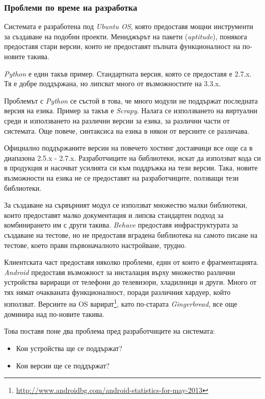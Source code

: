 \subsubsection{Проблеми по време на разработка}

	Системата е разработена под \emph{Ubuntu \ac{OS}}, която предоставя мощни инструменти за създаване на подобни проекти. Мениджърът на пакети (\emph{aptitude}), понякога предоставя стари версии, които не предоставят пълната функционалност на по-новите такива.
	
	\emph{Python} е един такъв пример. Стандартната версия, която се предоставя е 2.7.x. Тя е добре поддържана, но липсват много от възможностите на 3.3.x. 
	
	Проблемът с \emph{Python} се състой в това, че много модули не поддържат последната версия на езика. Пример за такъв е \emph{Scrapy}. Налага се използването на виртуални среди и използването на различни версии за езика, за различни части от системата. Още повече, синтаксиса на езика в някои от версиите се различава.
	
	Официално поддържаните версии на повечето хостинг доставчици все още са в диапазона 2.5.x - 2.7.x. Разработчиците на библиотеки, искат да използват кода си в продукция и насочват усилията си към поддръжка на тези версии. Така, новите възможности на езика не се предоставят на разработчиците, ползващи тези библиотеки.
	
	За създаване на сървърният модул се използват множество малки библиотеки, които предоставят малко документация и липсва стандартен подход за комбинирането им с други такива. \emph{Behave} предоставя инфраструктурата за създаване на тестове, но не предоставя вградена библиотека на самото писане на тестове, което прави първоначалното настройване, трудно.
	
	Клиентската част предоставя няколко проблеми, един от които е фрагментацията. \emph{Android} предоставя възможност за инсталация върху множество различни устройства вариращи от телефони до телевизори, хладилници и други. Много от тях нямат очакваната функционалност, поради различния хардуер, който използват. Версиите на \ac{OS} варират\footnote{\url{http://www.androidbg.com/android-statistics-for-may-2013}}, като по-старата \emph{Gingerbread}, все още доминира над по-новите такива.
	
	Това поставя поне два проблема пред разработчиците на системата:
	
	\begin{itemize}
		\item Кои устройства ще се поддържат?
		\item Кои версии ще се поддържат?
	\end{itemize}
	
